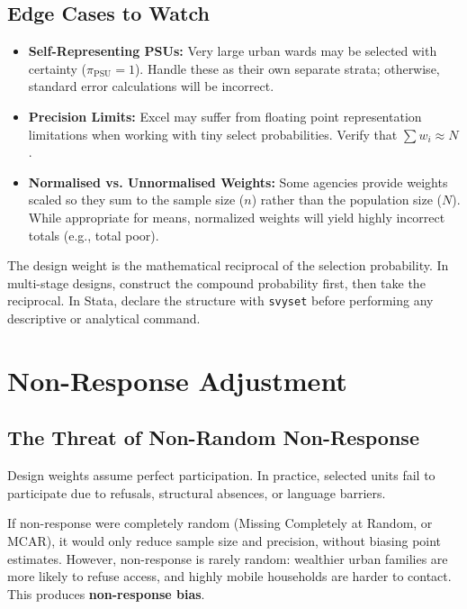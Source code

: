 \documentclass[11pt,a4paper]{article}
\begin{document}
\subsection{Edge Cases to Watch}
\begin{itemize}
  \item \textbf{Self-Representing PSUs:} Very large urban wards may be selected with certainty ($\pi_{\text{PSU}} = 1$). Handle these as their own separate strata; otherwise, standard error calculations will be incorrect.
  \item \textbf{Precision Limits:} Excel may suffer from floating point representation limitations when working with tiny select probabilities. Verify that $\sum w_i \approx N$.
  \item \textbf{Normalised vs. Unnormalised Weights:} Some agencies provide weights scaled so they sum to the sample size ($n$) rather than the population size ($N$). While appropriate for means, normalized weights will yield highly incorrect totals (e.g., total poor).
\end{itemize}

\begin{keytakeaway}
The design weight is the mathematical reciprocal of the selection probability. In multi-stage designs, construct the compound probability first, then take the reciprocal. In Stata, declare the structure with \texttt{svyset} before performing any descriptive or analytical command.
\end{keytakeaway}

\newpage

\section{Non-Response Adjustment}

\subsection{The Threat of Non-Random Non-Response}
Design weights assume perfect participation. In practice, selected units fail to participate due to refusals, structural absences, or language barriers. 

If non-response were completely random (Missing Completely at Random, or MCAR), it would only reduce sample size and precision, without biasing point estimates. However, non-response is rarely random: wealthier urban families are more likely to refuse access, and highly mobile households are harder to contact. This produces \textbf{non-response bias}.
\end{document}
